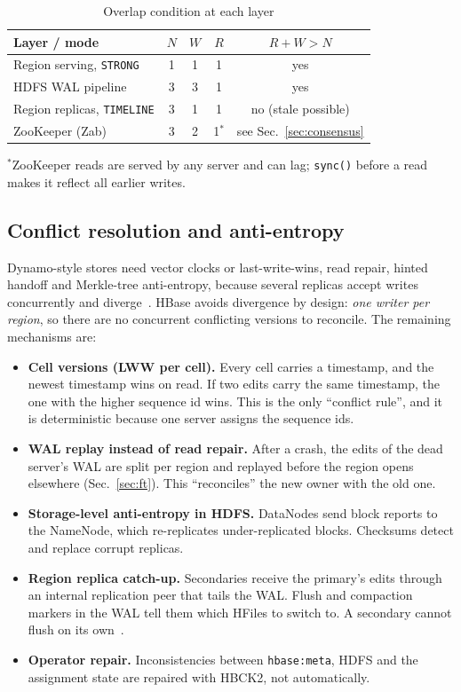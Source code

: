 \documentclass[10pt,twocolumn,letterpaper]{article}
\newcommand{\code}[1]{\texttt{\small #1}}
\begin{document}
\begin{table}[t]
\caption{Overlap condition at each layer}\label{tab:quorum}
\small
\begin{tabularx}{\columnwidth}{@{}Xcccc@{}}
\toprule
Layer / mode & $N$ & $W$ & $R$ & $R{+}W{>}N$ \\
\midrule
Region serving, \code{STRONG} & 1 & 1 & 1 & yes \\
HDFS WAL pipeline & 3 & 3 & 1 & yes \\
Region replicas, \code{TIMELINE} & 3 & 1 & 1 & no (stale possible) \\
ZooKeeper (Zab) & 3 & 2 & 1$^{*}$ & see Sec.~\ref{sec:consensus} \\
\bottomrule
\end{tabularx}
\footnotesize $^{*}$ZooKeeper reads are served by any server and can lag; \code{sync()} before a read makes it reflect all earlier writes.
\end{table}

\subsection{Conflict resolution and anti-entropy}
Dynamo-style stores need vector clocks or last-write-wins, read repair, hinted handoff and Merkle-tree anti-entropy, because several replicas accept writes concurrently and diverge~\cite{dynamo}. HBase avoids divergence by design: \emph{one writer per region}, so there are no concurrent conflicting versions to reconcile. The remaining mechanisms are:
\begin{itemize}
\item \textbf{Cell versions (LWW per cell).} Every cell carries a timestamp, and the newest timestamp wins on read. If two edits carry the same timestamp, the one with the higher sequence id wins. This is the only ``conflict rule'', and it is deterministic because one server assigns the sequence ids.
\item \textbf{WAL replay instead of read repair.} After a crash, the edits of the dead server's WAL are split per region and replayed before the region opens elsewhere (Sec.~\ref{sec:ft}). This ``reconciles'' the new owner with the old one.
\item \textbf{Storage-level anti-entropy in HDFS.} DataNodes send block reports to the NameNode, which re-replicates under-replicated blocks. Checksums detect and replace corrupt replicas.
\item \textbf{Region replica catch-up.} Secondaries receive the primary's edits through an internal replication peer that tails the WAL. Flush and compaction markers in the WAL tell them which HFiles to switch to. A secondary cannot flush on its own~\cite{timeline}.
\item \textbf{Operator repair.} Inconsistencies between \code{hbase:meta}, HDFS and the assignment state are repaired with HBCK2, not automatically.
\end{itemize}
\end{document}
